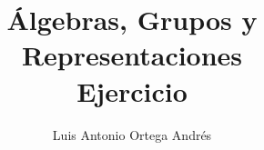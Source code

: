 \documentclass[UTF8]{article}
\begin{document}
\title{Álgebras, Grupos y Representaciones \\
      \large Ejercicio
  }

\author{Luis Antonio Ortega Andrés}

\maketitle



\end{document}
